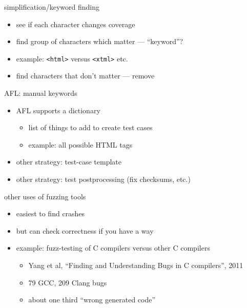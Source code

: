 \begin{frame}[fragile,label=keywordFinding]{simplification/keyword finding}
    \begin{itemize}
        \item see if each character changes coverage
        \item find group of characters which matter --- ``keyword''?
        \item example: \verb|<html>| versus \verb|<xtml>| etc.
        \item find characters that don't matter --- remove
    \end{itemize}
\end{frame}

\begin{frame}{AFL: manual keywords}
    \begin{itemize}
    \item AFL supports a dictionary
        \begin{itemize}
        \item list of things to add to create test cases
        \item example: all possible HTML tags
        \end{itemize}
        \vspace{.5cm}
    \item other strategy: test-case template
    \item other strategy: test postprocessing (fix checksums, etc.)
    \end{itemize}
\end{frame}

\begin{frame}{other uses of fuzzing tools}
    \begin{itemize}
        \item easiest to find crashes
        \item but can check correctness if you have a way
        \item example: fuzz-testing of C compilers versus other C compilers
            \begin{itemize}
            \item Yang et al, ``Finding and Understanding Bugs in C compilers'', 2011
            \item 79 GCC, 209 Clang bugs
            \item about one third ``wrong generated code''
            \end{itemize}
    \end{itemize}
\end{frame}


